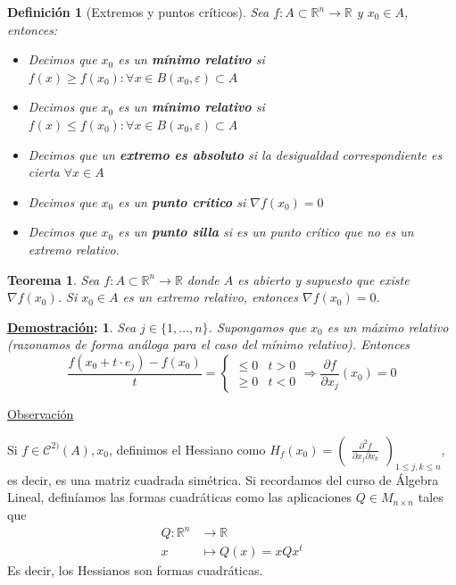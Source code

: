 \documentclass[10pt,a4paper,openright]{book}
\theoremstyle{break}
\newtheorem*{defi}{Definición}
\newtheorem*{theo}{Teorema}
\newtheorem*{demo}{\underline{Demostración}:}
\begin{document}
\begin{defi}[Extremos y puntos críticos]
Sea $f: A \subset \mathbb{R}^n \to  \mathbb{R}$ y $x_0 \in A$, entonces:
\begin{itemize}
\item Decimos que $x_0$ es un \textbf{mínimo relativo} si $f(x) \geq f(x_0) : \forall x \in B(x_0, \varepsilon) \subset A$
\item Decimos que $x_0$ es un \textbf{mínimo relativo} si $f(x) \leq f(x_0) : \forall x \in B(x_0, \varepsilon) \subset A$
\item Decimos que un \textbf{extremo es absoluto} si la desigualdad correspondiente es cierta $\forall x \in A$
\item Decimos que $x_0$ es un \textbf{punto crítico} si $\nabla f(x_0) = 0$
\item Decimos que $x_0$ es un \textbf{punto silla} si es un punto crítico que no es un extremo relativo.
\end{itemize}
\end{defi}

\begin{theo}
Sea $f: A \subset \mathbb{R}^n \to \mathbb{R}$ donde $A$ es abierto y supuesto que existe $\nabla f(x_0)$. Si $x_0 \in A$ es un extremo relativo, entonces $\nabla f (x_0) = 0$.
\end{theo}

\begin{demo}
Sea $j \in \{1, \ldots, n\}$. Supongamos que $x_0$ es un máximo relativo (razonamos de forma análoga para el caso del mínimo relativo). Entonces
$$\frac{f(x_0 + t \cdot e_j) - f(x_0)}{t} = \begin{cases} \leq 0 & t> 0 \\ \geq 0 & t < 0 \end{cases}\Rightarrow \frac{\partial f}{\partial x_j} (x_0) = 0$$
\end{demo}

\underline{Observación}

Si $f \in \mathcal{C}^{2)}(A), x_0$, definimos el Hessiano como $ H_f (x_0) = \begin{pmatrix}
\frac{\partial^2 f}{\partial x_j \partial x_k}
\end{pmatrix}_{1 \leq j,k \leq n}$, es decir, es una matriz cuadrada simétrica. Si recordamos del curso de Álgebra Lineal, definíamos las formas cuadráticas como las aplicaciones $Q \in M_{n \times n}$ tales que
\begin{align*}
Q: \mathbb{R}^n &\to \mathbb{R} \\ x &\mapsto Q(x) = x Q x^t
\end{align*}
Es decir, los Hessianos son formas cuadráticas.
\end{document}
